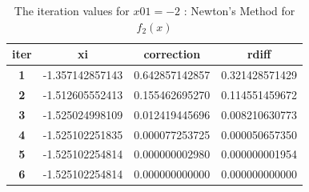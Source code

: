 \documentclass[a4paper, 12pt]{report}
\begin{document}
\begin{table}[h]
\centering
\begin{tabular}{|c|l|l|l|}
\hline
\textbf{iter} & \multicolumn{1}{c|}{\textbf{xi}} & \multicolumn{1}{c|}{\textbf{correction}} & \multicolumn{1}{c|}{\textbf{rdiff}} \\ \hline
\textbf{1} & -1.357142857143 & 0.642857142857 & 0.321428571429 \\ \hline
\textbf{2} & -1.512605552413 & 0.155462695270 & 0.114551459672 \\ \hline
\textbf{3} & -1.525024998109 & 0.012419445696 & 0.008210630773 \\ \hline
\textbf{4} & -1.525102251835 & 0.000077253725 & 0.000050657350 \\ \hline
\textbf{5} & -1.525102254814 & 0.000000002980 & 0.000000001954 \\ \hline
\textbf{6} & -1.525102254814 & 0.000000000000 & 0.000000000000 \\ \hline
\end{tabular}
\caption{The iteration values for $x01 = -2$ : Newton's Method for $f_{2}(x)$}
\label{table:7}
\end{table}
\end{document}
